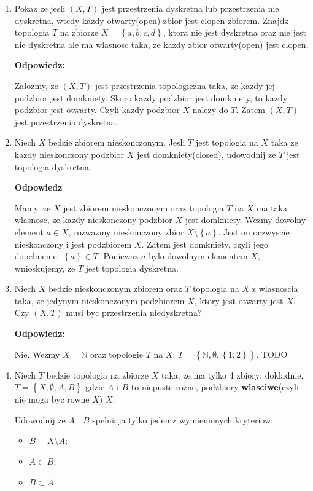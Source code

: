 \documentclass{article}
\begin{document}
\begin{enumerate}
    \item Pokaz ze jesli $(X,T)$ jest przestrzenia dyskretna lub przestrzenia nie dyskretna, wtedy kazdy otwarty(open) zbior jest clopen zbiorem. Znajdz topologia $T$ na zbiorze $X = \left\{ a,b,c,d \right\}$, ktora nie jest dyskretna oraz nie jest nie dyskretna ale ma wlasnosc taka, ze kazdy zbior otwarty(open) jest clopen.

        \textbf{Odpowiedz:}

        Zalozmy, ze $(X,T)$ jest przestrzenia topologiczna taka, ze kazdy jej podzbior jest domkniety. Skoro kazdy podzbior jest domkniety, to kazdy podzbior jest otwarty. Czyli kazdy podzbior $X$ nalezy do $T$. Zatem $(X,T)$ jest przestrzenia dyskretna. 

    \item Niech $X$ bedzie zbiorem nieskonczonym. Jesli $T$ jest topologia na $X$ taka ze kazdy nieskonczony podzbior $X$ jest domkniety(closed), udowodnij ze $T$ jest topologia dyskretna.

        \textbf{Odpowiedz}

        Mamy, ze $X$ jest zbiorem nieskonczonym oraz topologia $T$ na $X$ ma taka wlasnosc, ze kazdy nieskonczony podzbior $X$ jest domkniety. Wezmy dowolny element $a \in X$, rozwazmy nieskonczony zbior $X\setminus \left\{ a \right\}$. Jest on oczwyscie nieskonczony i jest podzbiorem $X$. Zatem jest domkniety, czyli jego dopelnienie- $\left\{ a \right\} \in T$. Poniewaz $a$ bylo dowolnym elementem $X$, wnioskujemy, ze $T$ jest topologia dyskretna.

    \item Niech $X$ bedzie nieskonczonym zbiorem oraz $T$ topologia na $X$ z wlasnoscia taka, ze jedynym nieskonczonym podzbiorem $X$, ktory jest otwarty jest $X$. Czy $(X, T)$ musi byc przestrzenia niedyskretna?

        \textbf{Odpowiedz:}

        Nie. Wezmy $X = \mathbb{N}$ oraz topologie $T$ na $X$: $T = \left\{ \mathbb{N}, \emptyset, \left\{ 1,2 \right\} \right\}$. TODO 

    \item Niech $T$ bedzie topologia na zbiorze $X$ taka, ze ma tylko 4 zbiory; dokladnie, $T = \left\{ X, \emptyset, A, B \right\}$ gdzie $A$ i $B$ to niepuste rozne, podzbiory \textbf{wlasciwe}(czyli nie moga byc rowne $X$) $X$.

        Udowodnij ze $A$ i $B$ spelniaja tylko jeden z wymienionych kryteriow:
        \begin{itemize}
            \item $B = X \setminus A$;
            \item $A \subset B$;
            \item $B \subset A$.
        \end{itemize}


\end{enumerate}
\end{document}
